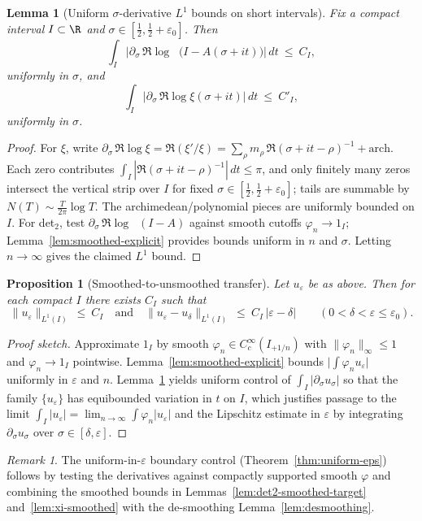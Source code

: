 \documentclass[11pt]{article}
\newtheorem{proposition}[theorem]{Proposition}
\newtheorem{lemma}[theorem]{Lemma}
\theoremstyle{remark}
\newtheorem{remark}[theorem]{Remark}
\DeclareMathOperator{\dettwo}{det_2}
\begin{document}
\begin{lemma}[Uniform $\sigma$-derivative $L^1$ bounds on short intervals]\label{lem:uniform-derivative-L1}
Fix a compact interval $I\subset\R$ and $\sigma\in[\tfrac12,\tfrac12+\varepsilon_0]$. Then
\[
 \int_I \Big|\partial_\sigma\,\Re\log\dettwo\big(I-A(\sigma+it)\big)\Big|\,dt\ \le\ C_I,
\]
uniformly in $\sigma$, and
\[
 \int_I \Big|\partial_\sigma\,\Re\log\xi(\sigma+it)\Big|\,dt\ \le\ C'_I,
\]
uniformly in $\sigma$.
\end{lemma}
\begin{proof}
For $\xi$, write $\partial_\sigma\,\Re\log\xi=\Re(\xi'/\xi)=\sum_{\rho} m_{\rho}\,\Re(\sigma+it-\rho)^{-1}+\text{arch}$. Each zero contributes $\int_I |\Re(\sigma+it-\rho)^{-1}|\,dt\le \pi$, and only finitely many zeros intersect the vertical strip over $I$ for fixed $\sigma\in[\tfrac12,\tfrac12+\varepsilon_0]$; tails are summable by $N(T)\sim \tfrac{T}{2\pi}\log T$. The archimedean/polynomial pieces are uniformly bounded on $I$. For det$_2$, test $\partial_\sigma\,\Re\log\dettwo(I-A)$ against smooth cutoffs $\varphi_n\to 1_I$; Lemma~\ref{lem:smoothed-explicit} provides bounds uniform in $n$ and $\sigma$. Letting $n\to\infty$ gives the claimed $L^1$ bound.
\end{proof}

\begin{proposition}[Smoothed-to-unsmoothed transfer]\label{prop:desmoothing}
Let $u_\varepsilon$ be as above. Then for each compact $I$ there exists $C_I$ such that
\[
 \|u_\varepsilon\|_{L^1(I)}\ \le\ C_I\quad \text{and}\quad \|u_\varepsilon-u_\delta\|_{L^1(I)}\ \le\ C_I\,|\varepsilon-\delta|\qquad (0<\delta<\varepsilon\le \varepsilon_0).
\]
\end{proposition}
\begin{proof}[Proof sketch]
Approximate $1_I$ by smooth $\varphi_n\in C_c^{\infty}(I_{+1/n})$ with $\|\varphi_n\|_\infty\le 1$ and $\varphi_n\to 1_I$ pointwise. Lemma~\ref{lem:smoothed-explicit} bounds $\big|\int \varphi_n u_\varepsilon\big|$ uniformly in $\varepsilon$ and $n$. Lemma~\ref{lem:uniform-derivative-L1} yields uniform control of $\int_I |\partial_\sigma u_\sigma|$ so that the family $\{u_\varepsilon\}$ has equibounded variation in $t$ on $I$, which justifies passage to the limit $\int_I |u_\varepsilon|=\lim_{n\to\infty}\int \varphi_n |u_\varepsilon|$ and the Lipschitz estimate in $\varepsilon$ by integrating $\partial_\sigma u_\sigma$ over $\sigma\in[\delta,\varepsilon]$.
\end{proof}

\begin{remark}
The uniform-in-$\varepsilon$ boundary control (Theorem~\ref{thm:uniform-eps}) follows by testing the derivatives against compactly supported smooth $\varphi$ and combining the smoothed bounds in Lemmas~\ref{lem:det2-smoothed-target} and~\ref{lem:xi-smoothed} with the de-smoothing Lemma~\ref{lem:desmoothing}.
\end{remark}
\end{document}
